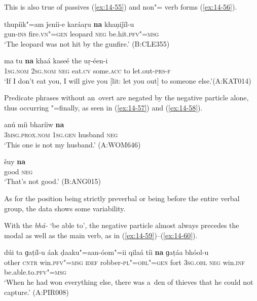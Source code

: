 This is also true of passives (\ref{ex:14-55}) and non"= verb forms (\ref{ex:14-56}).

\begin{exe}
\ex
\label{ex:14-55}
\gll thupíik"=am ǰeníi-e karáaṛu \textbf{na} khaṇiǰíl-u \\
gun-\textsc{ins} fire.\textsc{vn"=gen} leopard \textsc{neg} be.hit.\textsc{pfv"=msg}  \\
\glt `The leopard was not hit by the gunfire.' (B:CLE355)

\ex
\label{ex:14-56}
\gll ma tu \textbf{na} khaá kaseé the uṛ-éen-i \\
\textsc{1sg.nom} \textsc{2sg.nom} \textsc{neg} eat.\textsc{cv} some.\textsc{acc} to let.out-\textsc{prs-f} \\
\glt `If I don't eat you, I will give you [lit: let you out] to someone else.'\newline (A:KAT014)
\end{exe}

Predicate  phrases without an~overt  are negated by the negative particle alone, thus occurring "=finally, as seen in (\ref{ex:14-57}) and (\ref{ex:14-58}).

\begin{exe}
\ex
\label{ex:14-57}
\gll anú míi bharíiw \textbf{na} \\
\textsc{3msg.prox.nom} \textsc{1sg.gen} husband \textsc{neg} \\
\glt `This one is not my husband.' (A:WOM646)

\ex
\label{ex:14-58}
\gll šuy \textbf{na} \\
good \textsc{neg} \\
\glt `That's not good.' (B:ANG015)
\end{exe}

As for the position being strictly preverbal or being before the entire verbal group, the data shows some variability. 


With the  \textit{bhá-} `be able to', the negative particle almost always precedes the modal as well as the main verb, as in (\ref{ex:14-59})--(\ref{ex:14-60}).

\ea
\label{ex:14-59}
\gll dúi ta ɡaṭíl-u áak ḍaaku"=aan-óom"=ii qilaá tíi \textbf{na} ɡaṭáa bhóol-u \\
other \textsc{cntr} win.\textsc{pfv"=msg} \textsc{idef} robber-\textsc{pl"=obl"=gen} fort  \textsc{3sg.obl} \textsc{neg} win.\textsc{inf} be.able.to.\textsc{pfv"=msg}  \\
\glt `When he had won everything else, there was a~den of thieves that he could not capture.' (A:PIR008)

